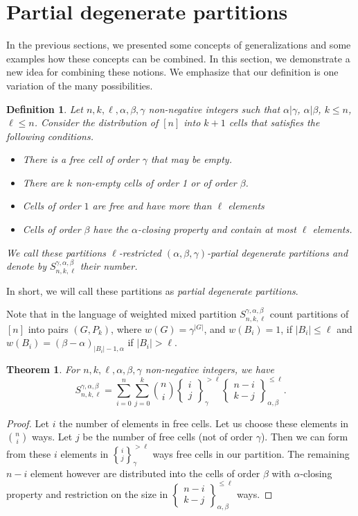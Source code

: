 \documentclass[12pt, reqno]{amsart}
\newtheorem{proof 1}{proof 1}
\newtheorem{theorem}{Theorem}[section]
\newtheorem{definition}{Definition}[section]
\def\sts#1#2{\begin{Bmatrix}
#1 \\ #2 \end{Bmatrix}}
\begin{document}
\section{Partial degenerate partitions}\label{section:4}
In the previous sections, we presented some concepts of  generalizations and some examples how these concepts can be combined. In this section, we demonstrate a new idea for combining these notions. We emphasize that our definition is one variation of the many possibilities.


\begin{definition}\label{definition:4}
Let $n,k,\ell, \alpha,\beta,\gamma$ non-negative integers such that $\alpha|\gamma$, $\alpha|\beta$, $k\leq n$, $\ell\leq n$. 
Consider the distribution of $[n]$ into $k+1$ cells that satisfies the following conditions. 
\begin{itemize}
	\item[1.] There is a free cell of order $\gamma$ that may be empty. 
	\item[2.] There are $k$ non-empty cells of order 1 or of order $\beta$. 
	\item[3.] Cells of order $1$ are free and have more than $\ell$ elements
	\item[4.] Cells of order $\beta$ have the $\alpha$-closing property and contain at most $\ell$ elements.
\end{itemize}
We call  these partitions \emph{$\ell$-restricted $(\alpha,\beta,\gamma)$-partial degenerate partitions} and denote by $S^{\gamma,\alpha,\beta}_{n,k,\ell}$ their number.
\end{definition}



In short, we will call these partitions as \emph{partial degenerate partitions}. 

Note that in the language of weighted mixed partition $S^{\gamma,\alpha,\beta}_{n,k,\ell}$ count partitions of $[n]$ into pairs $(G, P_k)$, where $w(G) = \gamma^{|G|}$, and $w(B_i) = 1$, if $|B_i|\leq \ell$ and $w(B_i) = (\beta-\alpha)_{|B_i|-1,\alpha}$ if $|B_i|>\ell$.

 \begin{theorem}\label{theorem:13}For $ n,k, \ell,\alpha, \beta, \gamma$ non-negative integers, we have
	\begin{equation}\label{equation:5}
S^{\gamma,\alpha,\beta}_{n,k,\ell}=\sum\limits_{i=0}^n\sum\limits_{j=0}^k\binom{n}{i}\sts{i}{j}_\gamma^{> \ell}\sts{n-i}{k-j}_{\alpha,\beta}^{\leq \ell}. 
	\end{equation}
\end{theorem}
\begin{proof}
Let $i$ the number of elements in free cells. Let us choose these elements in $\binom{n}{i}$ ways. Let $j$ be the number of free  cells (not of order $\gamma$). Then we can form from these $i$ elements in ${i\brace j}_\gamma^{> \ell}$ ways free cells in our partition. The remaining $n-i$ element however are distributed into the cells of order $\beta$ with $\alpha$-closing property and restriction on the size in $\sts{n-i}{k-j}_{\alpha,\beta}^{\leq \ell}$ ways.
\end{proof}
\end{document}
